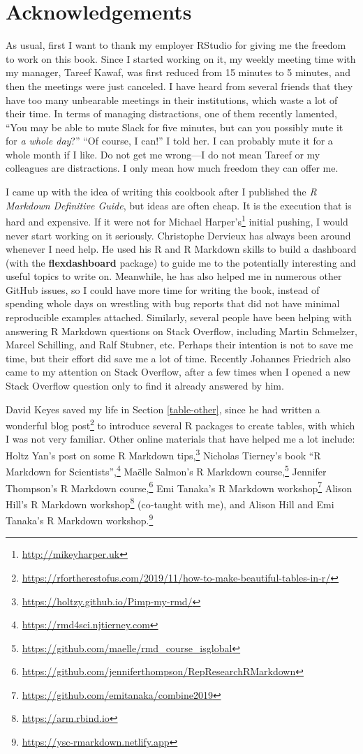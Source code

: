\documentclass[
  11pt,
]{krantz}
\renewcommand{\href}[2]{#2\footnote{\url{#1}}}
\begin{document}
\hypertarget{acknowledgements}{%
\section*{Acknowledgements}\label{acknowledgements}}


As usual, first I want to thank my employer RStudio for giving me the freedom to work on this book. Since I started working on it, my weekly meeting time with my manager, Tareef Kawaf, was first reduced from 15 minutes to 5 minutes, and then the meetings were just canceled. I have heard from several friends that they have too many unbearable meetings in their institutions, which waste a lot of their time. In terms of managing distractions, one of them recently lamented, ``You may be able to mute Slack for five minutes, but can you possibly mute it for \emph{a whole day}?'' ``Of course, I can!'' I told her. I can probably mute it for a whole month if I like. Do not get me wrong---I do not mean Tareef or my colleagues are distractions. I only mean how much freedom they can offer me.

I came up with the idea of writing this cookbook after I published the \emph{R Markdown Definitive Guide}, but ideas are often cheap. It is the execution that is hard and expensive. If it were not for \href{http://mikeyharper.uk}{Michael Harper's} initial pushing, I would never start working on it seriously. Christophe Dervieux has always been around whenever I need help. He used his R and R Markdown skills to build a dashboard (with the \textbf{flexdashboard} package) to guide me to the potentially interesting and useful topics to write on. Meanwhile, he has also helped me in numerous other GitHub issues, so I could have more time for writing the book, instead of spending whole days on wrestling with bug reports that did not have minimal reproducible examples attached. Similarly, several people have been helping with answering R Markdown questions on Stack Overflow, including Martin Schmelzer, Marcel Schilling, and Ralf Stubner, etc. Perhaps their intention is not to save me time, but their effort did save me a lot of time. Recently Johannes Friedrich also came to my attention on Stack Overflow, after a few times when I opened a new Stack Overflow question only to find it already answered by him.

David Keyes saved my life in Section \ref{table-other}, since he had written \href{https://rfortherestofus.com/2019/11/how-to-make-beautiful-tables-in-r/}{a wonderful blog post} to introduce several R packages to create tables, with which I was not very familiar. Other online materials that have helped me a lot include: Holtz Yan's \href{https://holtzy.github.io/Pimp-my-rmd/}{post on some R Markdown tips,} Nicholas Tierney's book \href{https://rmd4sci.njtierney.com}{``R Markdown for Scientists'',} Maëlle Salmon's \href{https://github.com/maelle/rmd_course_isglobal}{R Markdown course,} Jennifer Thompson's \href{https://github.com/jenniferthompson/RepResearchRMarkdown}{R Markdown course,} Emi Tanaka's \href{https://github.com/emitanaka/combine2019}{R Markdown workshop} Alison Hill's \href{https://arm.rbind.io}{R Markdown workshop} (co-taught with me), and Alison Hill and Emi Tanaka's \href{https://ysc-rmarkdown.netlify.app}{R Markdown workshop.}
\end{document}
